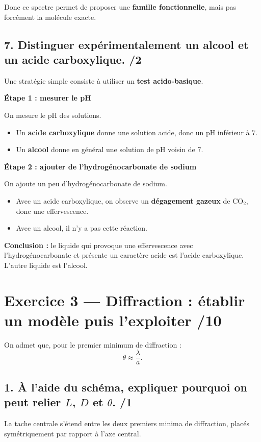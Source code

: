 \documentclass[11pt,a4paper]{article}
\begin{document}
Donc ce spectre permet de proposer une \textbf{famille fonctionnelle}, mais pas forcément la molécule exacte.

\subsection*{7. Distinguer expérimentalement un alcool et un acide carboxylique. \hfill /2}

Une stratégie simple consiste à utiliser un \textbf{test acido-basique}.

\textbf{Étape 1 : mesurer le pH}

On mesure le pH des solutions.
\begin{itemize}
    \item Un \textbf{acide carboxylique} donne une solution acide, donc un pH inférieur à \(7\).
    \item Un \textbf{alcool} donne en général une solution de pH voisin de \(7\).
\end{itemize}

\textbf{Étape 2 : ajouter de l'hydrogénocarbonate de sodium}

On ajoute un peu d'hydrogénocarbonate de sodium.
\begin{itemize}
    \item Avec un acide carboxylique, on observe un \textbf{dégagement gazeux} de \(\mathrm{CO_2}\), donc une effervescence.
    \item Avec un alcool, il n'y a pas cette réaction.
\end{itemize}

\textbf{Conclusion :} le liquide qui provoque une effervescence avec l'hydrogénocarbonate et présente un caractère acide est l'acide carboxylique. L'autre liquide est l'alcool.

\section*{Exercice 3 --- Diffraction : établir un modèle puis l'exploiter \hfill /10}

On admet que, pour le premier minimum de diffraction :
\[
\theta \approx \frac{\lambda}{a}.
\]

\subsection*{1. À l'aide du schéma, expliquer pourquoi on peut relier \(L\), \(D\) et \(\theta\). \hfill /1}

La tache centrale s'étend entre les deux premiers minima de diffraction, placés symétriquement par rapport à l'axe central.
\end{document}
